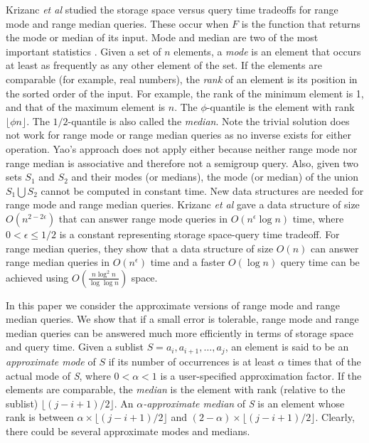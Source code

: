 \documentclass{llncs}
\begin{document}
Krizanc {\it et al} \cite{kms03} studied the storage space 
versus query time tradeoffs for range mode and range median queries. 
These occur when $F$ is the function that returns the mode or 
median of its input. Mode and median are two of the most 
important statistics \cite{am04,bccch00,llxy04,mrl98}. 
Given a set of $n$ elements, a {\it mode} 
is an element that occurs at least as frequently as any other 
element of the set. If the elements are comparable (for example, 
real numbers), the {\it rank} of an element is its position in 
the sorted order of the input. For example, the rank of the minimum 
element is 1, and that of the maximum element is $n$. The $\phi$-quantile 
is the element with rank $\lfloor \phi n \rfloor$. The $1/2$-quantile
is also called the {\it median}. Note the trivial solution 
does not work for  range mode or range median queries 
as no inverse exists for either operation.
Yao's approach does not apply either because neither range mode nor
range median is associative and therefore not a semigroup query. 
Also, given two sets $S_1$ 
and $S_2$ and their modes (or medians), the mode (or median) of the union 
$S_1 \bigcup S_2$ cannot be computed in constant time. New data structures are needed for
range mode and range median queries. 
Krizanc {\it et al} \cite{kms03} gave a data structure of 
size $O(n^{2-2\epsilon})$ 
that can answer range mode queries in $O(n^\epsilon \log n)$ time, where 
$0 < \epsilon \leq 1/2$ is a constant representing storage space-query
 time tradeoff.
For range median queries, they show that a data 
structure of size $O(n)$ can answer range median queries in
$O(n^\epsilon)$ time and a faster $O(\log n)$ query time can be achieved 
using $O(\frac{n\log^2n}{\log\log n})$ space.

    
In this paper we consider the approximate versions of range mode 
and range median queries. We show that if a small error is tolerable, 
range mode and range median queries can be answered 
much more efficiently in terms of storage space and query time.
Given a sublist $S=a_i,a_{i+1},\ldots,a_j$, an element is said to 
be an {\it approximate mode} of $S$ if its number of occurrences 
is at least $\alpha$ times that of the actual mode of {\it S}, 
where $0 < \alpha < 1$ is a user-specified  approximation factor.
If the elements are comparable, the {\it median} is the 
element with rank (relative to the sublist) 
$\lfloor (j-i+1)/2 \rfloor$.
An {\it $\alpha$-approximate median} of {\it S} is an element whose rank is
between $\alpha \times \lfloor (j-i+1)/2 \rfloor$ and 
$(2 - \alpha) \times \lfloor (j-i+1)/2\rfloor$. Clearly, there could be
several approximate modes and medians.
\end{document}
